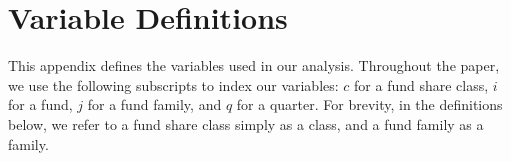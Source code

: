 \section{Variable Definitions}\label{tab:vardefs}

\vspace{0.3cm}

\noindent
\begin{minipage}{\linewidth}
This appendix defines the variables used in our analysis. Throughout the paper, we use the following subscripts to index our variables: $c$ for a fund share class, $i$ for a fund, $j$ for a fund family, and $q$ for a quarter. For brevity, in the definitions below, we refer to a fund share class simply as a class, and a fund family as a family.
\end{minipage}


